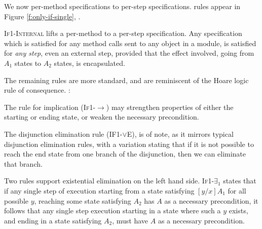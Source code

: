 We now 
per-method \Nec specifications 
to per-step \Nec specifications. 
 rules appear in Figure \ref{f:only-if-single}, 
.

\textsc{If1-Internal} 
 lifts a per-method \Nec {} to a per-step \Nec specification.
Any \Nec specification which is satisfied for any method
calls sent to any object in a module, is satisfied for \emph{any step}, even
an external step, provided that the effect involved, \ie going from $A_1$ states to
$A_2$ states, is encapsulated.

 The remaining rules are more standard, and are reminiscent of the Hoare logic rule of consequence.
:
 
The  rule for implication (\textsc{If1-$\longrightarrow$}) may strengthen
 properties of either the starting or ending state, or 
weaken the necessary precondition. 



The disjunction
elimination rule (\textsc{IF1-$\vee$E}), 
is of note, as it mirrors typical disjunction elimination
rules, with a variation stating that if it is not possible  to reach 
the end state from one branch of the disjunction, then we can eliminate 
that branch. 

Two rules support existential elimination on the left hand side. 
\textsc{If1-$\exists_1$} states that if any single step of execution starting
from a state satisfying $[y/x]A_1$ for all possible $y$, reaching some state satisfying
$A_2$ has $A$ as a necessary precondition, it follows that any single step execution
starting in a state where such a $y$ exists, and ending in a state satisfying $A_2$,
must have $A$ as a necessary precondition.

